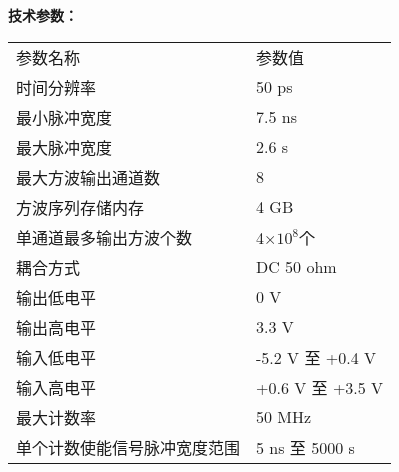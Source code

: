\vspace{0.4cm}
\noindent\xiaosi\textbf{技术参数：}
\vspace{0.1cm}
\song
\begin{table}[H]
{}
\begin{tabular}{m{6.5cm}|m{6.5cm}}
\rowcolor{myblue}
\color{white}参数名称& \color{white}参数值\\\arrayrulecolor{tabcolor}\midrule[1.2pt]
时间分辨率& 50 ps\\\arrayrulecolor{tabcolor}\midrule[1.2pt]
最小脉冲宽度& 7.5 ns \\\arrayrulecolor{tabcolor}\midrule[1.2pt]
最大脉冲宽度& 2.6 s\\\arrayrulecolor{tabcolor}\midrule[1.2pt]
最大方波输出通道数& 8\\\arrayrulecolor{tabcolor}\midrule[1.2pt]
方波序列存储内存& 4 GB\\\arrayrulecolor{tabcolor}\midrule[1.2pt]
单通道最多输出方波个数& 4×$10^{8}$个\\\midrule[1.2pt]
耦合方式& DC 50 ohm\\\arrayrulecolor{tabcolor}\midrule[1.2pt]
输出低电平& 0 V\\\arrayrulecolor{tabcolor}\midrule[1.2pt]
输出高电平& 3.3 V\\\arrayrulecolor{tabcolor}\midrule[1.2pt]
输入低电平& -5.2 V 至 +0.4 V\\\arrayrulecolor{tabcolor}\midrule[1.2pt]
输入高电平& +0.6 V 至 +3.5 V\\\arrayrulecolor{tabcolor}\midrule[1.2pt]
最大计数率& 50 MHz\\\arrayrulecolor{tabcolor}\midrule[1.2pt]
单个计数使能信号脉冲宽度范围& 5 ns 至 5000 s\\
\end{tabular}
\end{table}



